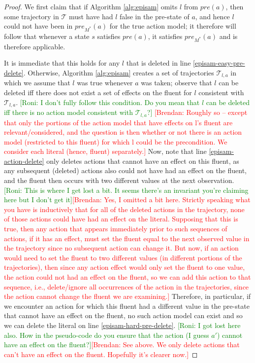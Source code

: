 \documentclass[letterpaper]{article} %
\newcommand{\pre}{\textit{pre}}
\newcommand{\brendan}[1]{{\textcolor{red}{[Brendan: #1]}}}
\newcommand{\roni}[1]{{\textcolor{green}{[Roni: #1]}}}
\begin{document}
\begin{proof}
We first claim that if Algorithm \ref{alg:episam} omits $l$ from $\pre(a)$, then some trajectory in $\mathcal{T}$ must have had $l$ false in the pre-state of $a$, and hence $l$ could not have been in $\pre_{M^*}(a)$ for the true action model; it therefore will follow that whenever a state $s$ satisfies $\pre(a)$, it satisfies $\pre_{M^*}(a)$ and is therefore applicable.

It is immediate that this holds for any $l$ that is deleted in line \ref{episam-easy-pre-delete}. 
Otherwise, Algorithm \ref{alg:episam} creates a set of trajectories $\mathcal{T}_{l,a}$ in which we assume that $l$ was true whenever $a$ was taken; 
observe that $l$ can be deleted iff there does not exist a set of effects on the fluent for $l$ consistent with $\mathcal{T}_{l,a}$. \roni{I don't fully follow this condition. Do you mean that $l$ can be deleted iff there is no action model consistent with $\mathcal{T}_{l,a}$?} \brendan{Roughly so -- except that only the portions of the action model that have effects on l's fluent are relevant/considered, and the question is then whether or not there is an action model (restricted to this fluent) for which l could be the precondition. We consider each literal (hence, fluent) separately.}
Now, note that line \ref{episam-action-delete} only deletes actions that cannot have an effect on this fluent, as any subsequent (deleted) actions also could not have had an effect on the fluent, and the fluent then occurs with two different values at the next observation. 
\roni{This is where I get lost a bit. It seems there's an invariant you're claiming here but I don't get it}\brendan{Yes, I omitted a bit here. Strictly speaking what you have is inductively that for all of the deleted actions in the trajectory, none of those actions could have had an effect on the literal. Supposing that this is true, then any action that appears immediately prior to such sequences of actions, if it has an effect, must set the fluent equal to the next observed value in the trajectory since no subsequent action can change it. But now, if an action would need to set the fluent to two different values (in different portions of the trajectories), then since any action effect would only set the fluent to one value, the action could not had an effect on the fluent, so we can add this action to that sequence, i.e., delete/ignore all occurrences of the action in the trajectories, since the action cannot change the fluent we are examining.}
Therefore, in particular, if we encounter an action for which this fluent had a different value in the pre-state that cannot have an effect on the fluent, no such action model can exist and so we can delete the literal on line \ref{episam-hard-pre-delete}. \roni{I got lost here also. How in the pseudo-code do you ensure that the action (I guess $a'$) cannot have an effect on the fluent?}\brendan{See above. We only delete actions that can't have an effect on the fluent. Hopefully it's clearer now.}

\end{proof}
\end{document}
